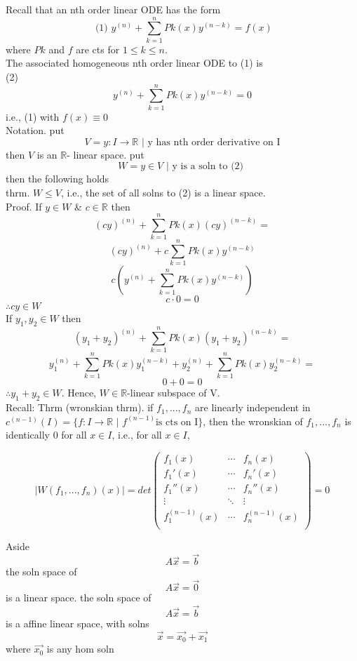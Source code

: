   \newpage
  Recall that an nth order linear ODE has the form 
  \[ \text{ (1) } y^{(n)} + \sum_{k=1}^n Pk(x)y^{(n-k)} = f(x)\]
  where \( Pk \) and \( f \) are cts for \( 1 \leq k \leq n \). \\
  The associated homogeneous nth order linear ODE to (1) is\\
  (2)
  \[ y^{(n)} + \sum_{k=1}^n Pk(x)y^{(n-k)} = 0 \]
  i.e., (1) with \( f(x) \equiv 0 \)\\
  Notation. put 
  \[ V = { y: I \to \mathbb{R} \text{ |  y has nth order derivative on I}  } \]
  then \( V \) is an \( \mathbb{R} \)- linear space. put 
  \[ W =  { y \in V \text{ | y is a soln to (2) }  } \]
  then the following holds\\[5mm]
  thrm. \( W \leq V \), i.e., the set of all solns to (2) is a linear
  space. \\
  Proof. If \( y \in W \) \& \( c \in \mathbb{R} \) then 
  \[ (cy)^{(n)} + \sum_{k=1}^n Pk(x)(cy)^{(n-k)}  = \]
  \[ (cy)^{(n)} + c\sum_{k=1}^n Pk(x)y^{(n-k)} \]
  \[ c(y^{(n)} + \sum_{k=1}^n Pk(x)y^{(n-k)}) \]
  \[ c \cdot 0 = 0 \]
  \( \therefore cy\in W \) \\
  If \( y_1, y_2 \in W \) then 
  \[ (y_1 + y_2)^{(n)} + \sum_{k=1}^n Pk(x)(y_1 +y_2 )^{(n-k)} = \]
  \[ y_1^{(n)} + \sum_{k=1}^n Pk(x)y_1^{(n-k)} + y_2^{(n)} +
  \sum_{k=1}^n Pk(x)y_2^{(n-k)} = \]
  \[ 0 + 0 = 0  \]
  \( \therefore y_1 + y_2 \in W \). Hence, \( W \in \mathbb{R} \)-linear
  subspace of V. \\[5mm]
  Recall: 
  Thrm (wronskian thrm). if \( f_1, ..., f_n \) are linearly independent
  in \( c^{(n-1)} (I) = \{ f:I\to \mathbb{R} \text{ | } f^{(n-1)} \text{
  is cts on I} \} \), then the wronskian of \( f_1, ..., f_n \) is identically 0
  for all \( x \in I \), i.e., for all \( x \in I \), 

  \[ |W(f_1, ...,f_n)(x)|  = det 
  \begin{pmatrix} 
    f_1(x)         & \cdots & f_n(x) \\
    f_1'(x)        & \cdots & f_n'(x) \\
    f_1''(x)       & \cdots & f_n''(x) \\
    \vdots         & \ddots & \vdots\\
    f_1^{(n-1)}(x) & \cdots & f_n^{(n-1)}(x) \\
  \end{pmatrix}
  =0\]


  Aside
  \[ A \vec{x}  = \vec{b} \]
  the soln space of 
  \[ A \vec{x} =\vec{0} \]
  is a linear space. the soln space of 
  \[ A \vec{x}  = \vec{b} \]
  is a affine linear space, with solns 
  \[ \vec{x} = \vec{x_0} + \vec{x_1}\]
  where \( \vec{x_0} \) is any hom soln

